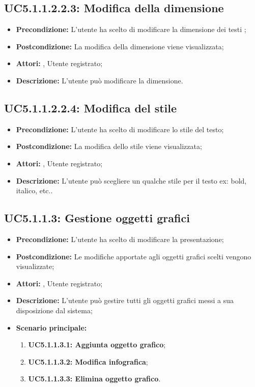 \subsection{ UC5.1.1.2.2.3: Modifica della dimensione }

\begin{itemize}
	\item \textbf{Precondizione:} L'utente ha scelto di modificare la dimensione dei testi ;
	\item \textbf{Postcondizione:} La modifica della dimensione viene visualizzata;
	\item \textbf{Attori:} , Utente registrato;
	\item \textbf{Descrizione:} L'utente può modificare la dimensione.
\end{itemize}
\subsection{ UC5.1.1.2.2.4: Modifica del stile}

\begin{itemize}
	\item \textbf{Precondizione:} L'utente ha scelto di modificare lo stile del testo;
	\item \textbf{Postcondizione:} La modifica dello stile viene visualizzata;
	\item \textbf{Attori:} , Utente registrato;
	\item \textbf{Descrizione:} L'utente può scegliere un qualche stile per il testo ex: bold, italico, etc..
\end{itemize}
\subsection{ UC5.1.1.3: Gestione oggetti grafici}

\begin{itemize}
	\item \textbf{Precondizione:} L'utente ha scelto di modificare la presentazione;
	\item \textbf{Postcondizione:} Le modifiche apportate agli oggetti grafici scelti vengono visualizzate;
	\item \textbf{Attori:} , Utente registrato;
	\item \textbf{Descrizione:} L'utente può gestire tutti gli oggetti grafici messi a sua disposizione dal sistema;
	\item \textbf{Scenario principale:}
	\begin{enumerate}
		\item \textbf{ UC5.1.1.3.1: Aggiunta oggetto grafico};
		\item \textbf{ UC5.1.1.3.2: Modifica infografica};
		\item \textbf{ UC5.1.1.3.3: Elimina oggetto grafico}.
	\end{enumerate}
\end{itemize}
